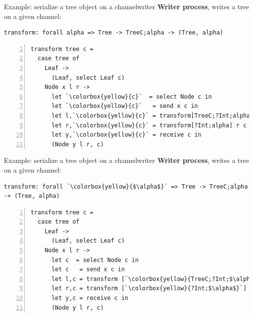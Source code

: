 \documentclass[10pt]{beamer}
\begin{document}
\begin{frame}[fragile]{Example:  serialize a tree object on a channel\hfill{\color{mLightBrown}writer}}
	\textbf{Writer process}, writes a tree on a given channel:
	
\begin{lstlisting}
transform: forall alpha => Tree -> TreeC;alpha -> (Tree, alpha)
\end{lstlisting}
\begin{lstlisting}[numbers=left, xleftmargin=0.7cm, escapeinside=\`\`]
transform tree c =
  case tree of
    Leaf ->
      (Leaf, select Leaf c)
    Node x l r ->
      let `\colorbox{yellow}{c}`  = select Node c in
      let `\colorbox{yellow}{c}`   = send x c in 
      let l,`\colorbox{yellow}{c}` = transform[TreeC;?Int;alpha] l c in
      let r,`\colorbox{yellow}{c}` = transform[?Int;alpha] r c in
      let y,`\colorbox{yellow}{c}` = receive c in
      (Node y l r, c)
\end{lstlisting}

\end{frame}

\begin{frame}[fragile]{Example:  serialize a tree object on a channel\hfill{\color{mLightBrown}writer}}
	\textbf{Writer process}, writes a tree on a given channel:
	
\begin{lstlisting}[escapeinside=\`\`]
transform: forall `\colorbox{yellow}{$\alpha$}` => Tree -> TreeC;alpha -> (Tree, alpha)
\end{lstlisting}
\begin{lstlisting}[numbers=left, xleftmargin=0.7cm, escapeinside=\`\`]
transform tree c =
  case tree of
    Leaf ->
      (Leaf, select Leaf c)
    Node x l r ->
      let c  = select Node c in
      let c   = send x c in 
      let l,c = transform [`\colorbox{yellow}{TreeC;?Int;$\alpha$}`] l c in
      let r,c = transform [`\colorbox{yellow}{?Int;$\alpha$}`] r c in
      let y,c = receive c in
      (Node y l r, c)
\end{lstlisting}

\end{frame}
\end{document}
